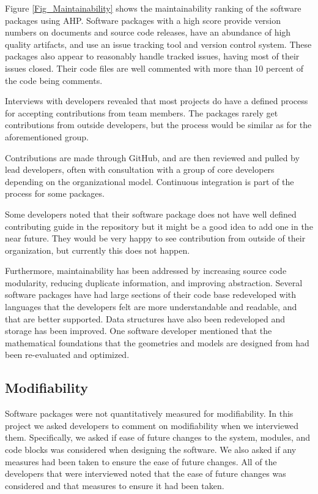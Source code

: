 \documentclass[12pt, notitlepage]{article}
\begin{document}
Figure \ref{Fig_Maintainability} shows the maintainability ranking of the software packages using AHP. Software packages with a high score provide version numbers on documents and source code releases, have an abundance of high quality artifacts, and use an issue tracking tool and version control system. These packages also appear to reasonably handle tracked issues, having most of their issues closed. Their code files are well commented with more than 10 percent of the code being comments. 

Interviews with developers revealed that most projects do have a defined process for accepting contributions from team members. The packages rarely get contributions from outside developers, but the process would be similar as for the aforementioned group.

Contributions are made through GitHub, and are then reviewed and pulled by lead developers, often with consultation with a group of core developers depending on the organizational model. Continuous integration is part of the process for some packages. 

Some developers noted that their software package does not have well defined contributing guide in the repository but it might be a good idea to add one in the near future. They would be very happy to see contribution from outside of their organization, but currently this does not happen.

Furthermore, maintainability has been addressed by increasing source code modularity, reducing duplicate information, and improving abstraction. Several software packages have had large sections of their code base redeveloped with languages that the developers felt are more understandable and readable, and that are better supported. Data structures have also been redeveloped and storage has been improved. One software developer mentioned that the mathematical foundations that the geometries and models are designed from had been re-evaluated and optimized. 

\subsection{Modifiability}

Software packages were not quantitatively measured for modifiability.
In this project we asked developers to comment on modifiability when we interviewed them. Specifically, we asked if ease of future changes to the system, modules, and code blocks was considered when designing the software. We also asked if any measures had been taken to ensure the ease of future changes. 
All of the developers that were interviewed noted that the ease of future changes was considered and that measures to ensure it had been taken.
\end{document}
